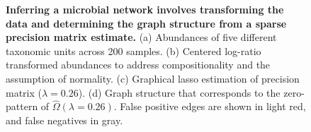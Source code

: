 \documentclass[
  a4paper,
]{article}
\begin{document}
\begin{figure}

\begin{minipage}[t]{0.50\linewidth}

{\centering 


}

\subcaption{\label{fig-conceptual-1}}
\end{minipage}%
%
\begin{minipage}[t]{0.50\linewidth}

{\centering 


}

\subcaption{\label{fig-conceptual-2}}
\end{minipage}%
\newline
\begin{minipage}[t]{0.50\linewidth}

{\centering 


}

\subcaption{\label{fig-conceptual-3}}
\end{minipage}%
%
\begin{minipage}[t]{0.50\linewidth}

{\centering 


}

\subcaption{\label{fig-conceptual-4}}
\end{minipage}%

\caption{\label{fig-conceptual}\textbf{Inferring a microbial network
involves transforming the data and determining the graph structure from
a sparse precision matrix estimate.} (a) Abundances of five different
taxonomic units across 200 samples. (b) Centered log-ratio transformed
abundances to address compositionality and the assumption of normality.
(c) Graphical lasso estimation of precision matrix (\(\lambda = 0.26\)).
(d) Graph structure that corresponds to the zero-pattern of
\(\hat \Omega(\lambda = 0.26)\). False positive edges are shown in light
red, and false negatives in gray.}

\end{figure}
\end{document}
